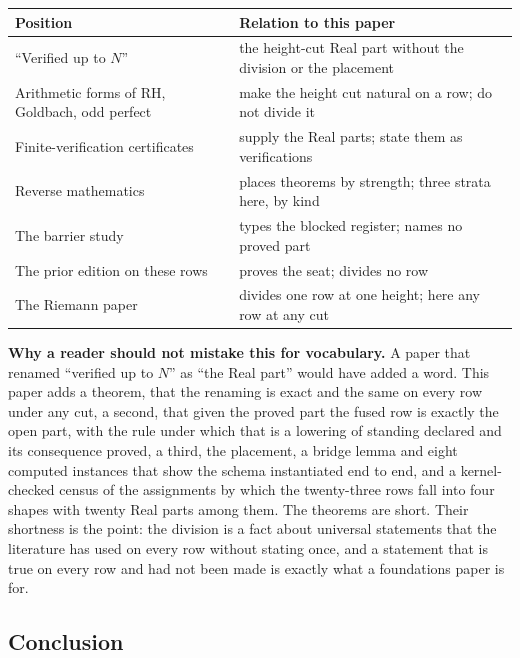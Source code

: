 \documentclass[10pt,twocolumn]{article}
\begin{document}
\begin{table}[!h]
\centering\scriptsize
\renewcommand{\arraystretch}{1.15}
\begin{tabularx}{\columnwidth}{@{}P{0.27\columnwidth} L@{}}
\toprule
\textbf{Position} & \textbf{Relation to this paper} \\
\midrule
``Verified up to $N$'' & the height-cut Real part without the division or the placement \\
Arithmetic forms of RH, Goldbach, odd perfect & make the height cut natural on a row; do not divide it \\
Finite-verification certificates & supply the Real parts; state them as verifications \\
Reverse mathematics & places theorems by strength; three strata here, by kind \\
The barrier study & types the blocked register; names no proved part \\
The prior edition on these rows & proves the seat; divides no row \\
The Riemann paper & divides one row at one height; here any row at any cut \\
\bottomrule
\end{tabularx}
\end{table}

\textbf{Why a reader should not mistake this for vocabulary.} A paper
that renamed ``verified up to \(N\)'' as ``the Real part'' would have
added a word. This paper adds a theorem, that the renaming is exact and
the same on every row under any cut, a second, that given the proved
part the fused row is exactly the open part, with the rule under which
that is a lowering of standing declared and its consequence proved, a
third, the placement, a bridge lemma and eight computed instances that
show the schema instantiated end to end, and a kernel-checked census of
the assignments by which the twenty-three rows fall into four shapes
with twenty Real parts among them. The theorems are short. Their
shortness is the point: the division is a fact about universal
statements that the literature has used on every row without stating
once, and a statement that is true on every row and had not been made is
exactly what a foundations paper is for.

\hypertarget{conclusion}{%
\subsection{Conclusion}\label{conclusion}}
\end{document}
